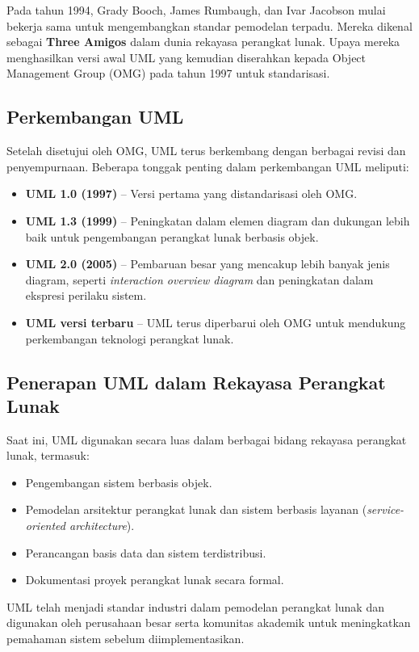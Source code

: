 Pada tahun 1994, Grady Booch, James Rumbaugh, dan Ivar Jacobson mulai bekerja sama untuk mengembangkan standar pemodelan terpadu. Mereka dikenal sebagai \textbf{Three Amigos} dalam dunia rekayasa perangkat lunak. Upaya mereka menghasilkan versi awal UML yang kemudian diserahkan kepada Object Management Group (OMG) pada tahun 1997 untuk standarisasi.

\subsection{Perkembangan UML}
Setelah disetujui oleh OMG, UML terus berkembang dengan berbagai revisi dan penyempurnaan. Beberapa tonggak penting dalam perkembangan UML meliputi:
\begin{itemize}
	\item \textbf{UML 1.0 (1997)} – Versi pertama yang distandarisasi oleh OMG.
	\item \textbf{UML 1.3 (1999)} – Peningkatan dalam elemen diagram dan dukungan lebih baik untuk pengembangan perangkat lunak berbasis objek.
	\item \textbf{UML 2.0 (2005)} – Pembaruan besar yang mencakup lebih banyak jenis diagram, seperti \textit{interaction overview diagram} dan peningkatan dalam ekspresi perilaku sistem.
	\item \textbf{UML versi terbaru} – UML terus diperbarui oleh OMG untuk mendukung perkembangan teknologi perangkat lunak.
\end{itemize}

\subsection{Penerapan UML dalam Rekayasa Perangkat Lunak}
Saat ini, UML digunakan secara luas dalam berbagai bidang rekayasa perangkat lunak, termasuk:
\begin{itemize}
	\item Pengembangan sistem berbasis objek.
	\item Pemodelan arsitektur perangkat lunak dan sistem berbasis layanan (\textit{service-oriented architecture}).
	\item Perancangan basis data dan sistem terdistribusi.
	\item Dokumentasi proyek perangkat lunak secara formal.
\end{itemize}

UML telah menjadi standar industri dalam pemodelan perangkat lunak dan digunakan oleh perusahaan besar serta komunitas akademik untuk meningkatkan pemahaman sistem sebelum diimplementasikan.


